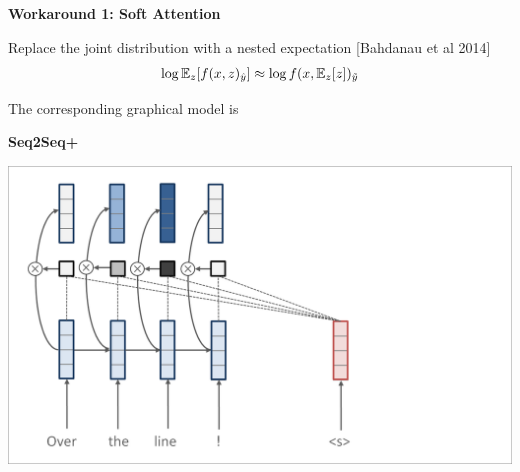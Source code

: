 \documentclass[aspectratio=169]{beamer}
\let\tempone\itemize
\let\temptwo\enditemize
\renewenvironment{itemize}{\tempone\addtolength{\itemsep}{0.5\baselineskip}}{\temptwo}
\newcommand{\thetitle}[1]{{\begin{center}\textbf{{#1}}\end{center}}}
\newcommand{\air}{\vspace{0.25cm}}
\begin{document}
\begin{frame}\thetitle{Workaround 1: Soft Attention}
\begin{itemize}
\item Replace the joint distribution with a nested expectation
{\small[Bahdanau et al 2014]}
    \begin{eqnarray*}
        \log \mathbb{E}_z [f(x, z)_{\hat{y}}] \approx \log f(x,\mathbb{E}_z[z])_{\tilde{y}}
    \end{eqnarray*}
\item The corresponding graphical model is
\air
\begin{figure}
        \centering
    \end{figure}
\end{itemize}
\end{frame}

\begin{frame}
  \begin{center}
    \textbf{Seq2Seq+} \air

  \end{center}
\center
\vspace{-5mm}
 \air
\includegraphics[scale=0.37]{nmt-attn4}
\end{frame}
\end{document}
